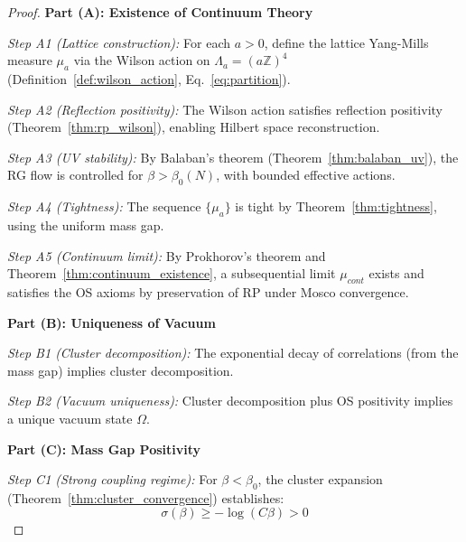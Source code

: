 \begin{proof}
\textbf{Part (A): Existence of Continuum Theory}

\textit{Step A1 (Lattice construction):}
For each $a > 0$, define the lattice Yang-Mills measure $\mu_a$ via the Wilson action on $\Lambda_a = (a\mathbb{Z})^4$ (Definition~\ref{def:wilson_action}, Eq.~\eqref{eq:partition}).

\textit{Step A2 (Reflection positivity):}
The Wilson action satisfies reflection positivity (Theorem~\ref{thm:rp_wilson}), enabling Hilbert space reconstruction.

\textit{Step A3 (UV stability):}
By Balaban's theorem (Theorem~\ref{thm:balaban_uv}), the RG flow is controlled for $\beta > \beta_0(N)$, with bounded effective actions.

\textit{Step A4 (Tightness):}
The sequence $\{\mu_a\}$ is tight by Theorem~\ref{thm:tightness}, using the uniform mass gap.

\textit{Step A5 (Continuum limit):}
By Prokhorov's theorem and Theorem~\ref{thm:continuum_existence}, a subsequential limit $\mu_{cont}$ exists and satisfies the OS axioms by preservation of RP under Mosco convergence.

\medskip
\textbf{Part (B): Uniqueness of Vacuum}

\textit{Step B1 (Cluster decomposition):}
The exponential decay of correlations (from the mass gap) implies cluster decomposition.

\textit{Step B2 (Vacuum uniqueness):}
Cluster decomposition plus OS positivity implies a unique vacuum state $\Omega$.

\medskip
\textbf{Part (C): Mass Gap Positivity}

\textit{Step C1 (Strong coupling regime):}
For $\beta < \beta_0$, the cluster expansion (Theorem~\ref{thm:cluster_convergence}) establishes:
\begin{equation}
\sigma(\beta) \geq -\log(C\beta) > 0
\end{equation}


\end{proof}
